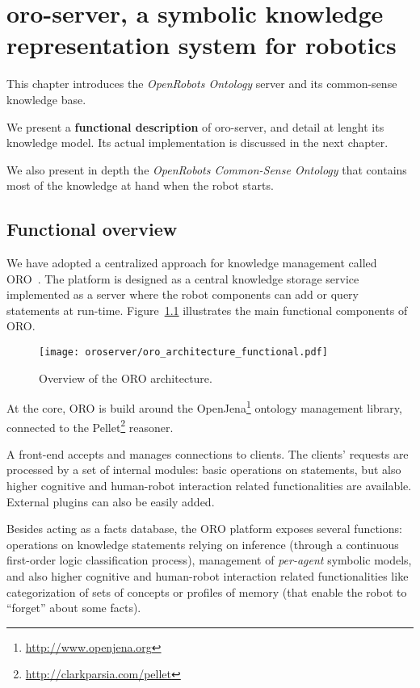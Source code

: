 \chapter{oro-server, a symbolic knowledge representation system for robotics}
\label{chapter|oroserver}

This chapter introduces the \emph{OpenRobots Ontology} server and its
common-sense knowledge base.

We present a \textbf{functional description} of oro-server, and detail at
lenght its knowledge model. Its actual implementation is discussed in the next
chapter.

We also present in depth the \emph{OpenRobots Common-Sense Ontology} that
contains most of the knowledge at hand when the robot starts.

\section{Functional overview}
\label{sect|functional-overview}


We have adopted a centralized approach for knowledge management called
ORO~\cite{Lemaignan2010}. The platform is designed as a central
knowledge storage service implemented as a server where the robot
components can add or query statements at run-time. Figure~\ref{fig|oro-overview}
illustrates the main functional components of ORO.

\begin{figure}
\centering
  \texttt{[image: oroserver/oro\_architecture\_functional.pdf]}
  \caption{Overview of the ORO architecture.}
  \label{fig|oro-overview}
\end{figure}

At the core, ORO is build around the
OpenJena\footnote{\url{http://www.openjena.org}} ontology management library,
connected to the Pellet\footnote{\url{http://clarkparsia.com/pellet}}
reasoner.

A front-end accepts and manages connections to clients. The clients' requests
are processed by a set of internal modules: basic operations on statements,
but also higher cognitive and human-robot interaction related functionalities
are available. External plugins can also be easily added.

Besides acting as a facts database, the ORO platform exposes several
functions: operations on knowledge statements relying on inference (through a
continuous first-order logic classification process), management of
\emph{per-agent} symbolic models, and also higher cognitive and human-robot
interaction related functionalities like categorization of sets of concepts
or profiles of memory (that enable the robot to ``forget'' about some facts).


